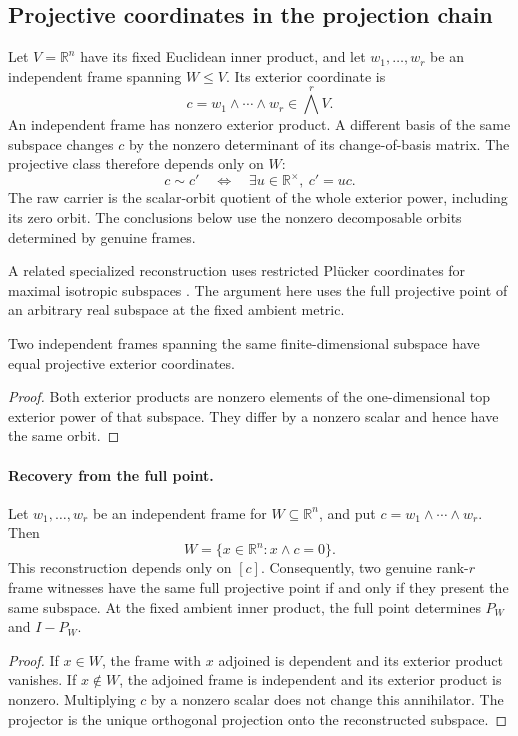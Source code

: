 \subsection{Projective coordinates in the projection chain}\label{sec:projective-observation-boundary}

Let \(V=\mathbb R^n\) have its fixed Euclidean inner product, and let
\(w_1,\ldots,w_r\) be an independent frame spanning \(W\le V\). Its exterior
coordinate is
\[
  c=w_1\wedge\cdots\wedge w_r\in\bigwedge^r V.
\]
An independent frame has nonzero exterior product. A different basis of the
same subspace changes \(c\) by the nonzero determinant of its change-of-basis
matrix. The projective class therefore depends only on \(W\):
\[
 c\sim c'\quad\Longleftrightarrow\quad
 \exists u\in\mathbb R^\times,\ c'=uc.
\]
The raw carrier is the scalar-orbit quotient of the whole exterior power,
including its zero orbit. The conclusions below use the nonzero decomposable
orbits determined by genuine frames.

A related specialized reconstruction uses restricted Pl\"ucker coordinates
for maximal isotropic subspaces \cite{dingKim2026plucker}. The argument here
uses the full projective point of an arbitrary real subspace at the fixed
ambient metric.

\begin{proposition}\label{prop:plucker-invariance}
  Two independent frames spanning the same finite-dimensional subspace have
  equal projective exterior coordinates.
\end{proposition}
\begin{proof}
  Both exterior products are nonzero elements of the one-dimensional top
  exterior power of that subspace. They differ by a nonzero scalar and hence
  have the same orbit.
\end{proof}

\paragraph{Recovery from the full point.}

\begin{proposition}
\label{prop:plucker-recovery}
  Let \(w_1,\ldots,w_r\) be an independent frame for
  \(W\subseteq\mathbb R^n\), and put
  \(c=w_1\wedge\cdots\wedge w_r\). Then
  \[
    W=\{x\in\mathbb R^n:x\wedge c=0\}.
  \]
  This reconstruction depends only on \([c]\). Consequently, two genuine
  rank-\(r\) frame witnesses have the same full projective point if and only
  if they present the same subspace. At the fixed ambient inner product,
  the full point determines \(P_W\) and \(I-P_W\).
\end{proposition}
\begin{proof}
  If \(x\in W\), the frame with \(x\) adjoined is dependent and its exterior
  product vanishes. If \(x\notin W\), the adjoined frame is independent and
  its exterior product is nonzero. Multiplying \(c\) by a nonzero scalar
  does not change this annihilator. The projector is the unique orthogonal
  projection onto the reconstructed subspace.
\end{proof}

